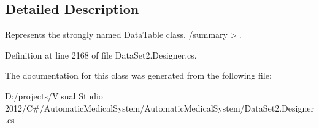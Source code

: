 \subsection{Detailed Description}
Represents the strongly named DataTable class. /summary$>$. 

Definition at line 2168 of file DataSet2.Designer.cs.

The documentation for this class was generated from the following file:\begin{CompactItemize}
\item 
D:/projects/Visual Studio 2012/C\#/AutomaticMedicalSystem/AutomaticMedicalSystem/DataSet2.Designer.cs\end{CompactItemize}
